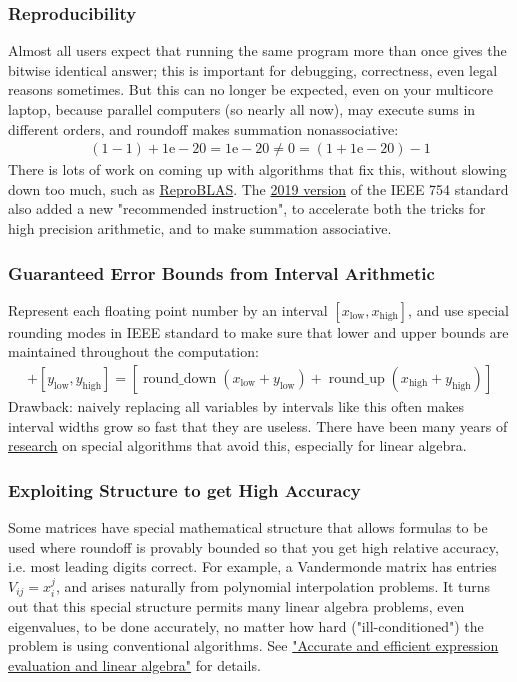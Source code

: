 \documentclass[11pt]{article}
\numberwithin{equation}{section}
\begin{document}
\subsubsection{Reproducibility}
Almost all users expect that running the same program more than once gives the bitwise identical answer; this is important for debugging, correctness, 
even legal reasons sometimes. But this can no longer be expected, even on your multicore laptop, because parallel computers (so nearly all now),
may execute sums in different orders, and roundoff makes summation nonassociative: \begin{align*}
    (1-1)+1\mathrm{e}-20 = 1\mathrm{e}-20 \neq 0 = (1+1\mathrm{e}-20)-1
\end{align*}
There is lots of work on coming up with algorithms that fix this, without slowing down too much, such as \href{http://bebop.cs.berkeley.edu/reproblas}{ReproBLAS}.
The \href{http://754r.ucbtest.org/background/ieee-computer.pdf}{2019 version} of the IEEE 754 standard also added a new "recommended instruction", 
to accelerate both the tricks for high precision arithmetic, and to make summation associative.

\subsubsection{Guaranteed Error Bounds from Interval Arithmetic}
Represent each floating point number by an interval $[x_{\mathrm{low}},x_{\mathrm{high}}]$, 
and use special rounding modes in IEEE standard to make sure that lower and upper bounds are maintained throughout the computation: \begin{align*}
    [x_{\mathrm{low}},x_{\mathrm{high}}] + [y_{\mathrm{low}},y_{\mathrm{high}}] = [\operatorname{round\_down}(x_{\mathrm{low}} + y_{\mathrm{low}}) + \operatorname{round\_up}(x_{\mathrm{high}} + y_{\mathrm{high}})]
\end{align*}
Drawback: naively replacing all variables by intervals like this often makes interval widths grow so fast that they are useless.
There have been many years of \href{http://www.ti3.tu-harburg.de/rump/}{research} on special algorithms that avoid this, especially for linear algebra.

\subsubsection{Exploiting Structure to get High Accuracy}
Some matrices have special mathematical structure that allows formulas to be used where roundoff is provably bounded so that you get high relative accuracy, 
i.e. most leading digits correct. For example, a Vandermonde matrix has entries $V_{ij} = x_i^j$, and arises naturally from polynomial interpolation problems. 
It turns out that this special structure permits many linear algebra problems, even eigenvalues, to be done accurately, 
no matter how hard ("ill-conditioned") the problem is using conventional algorithms. See \href{http://journals.cambridge.org/abstract_S0962492906350015}{"Accurate and efficient expression evaluation and linear algebra"} for details.
\end{document}
